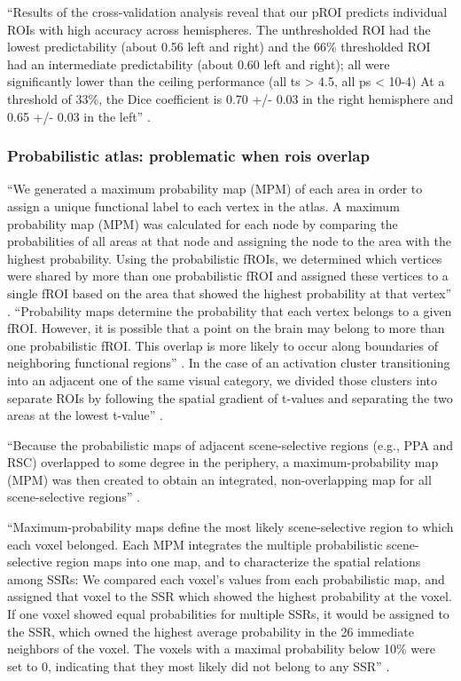 ``Results of the cross-validation analysis reveal that our pROI predicts
individual ROIs with high accuracy across hemispheres.
%
The unthresholded ROI had the lowest predictability (about 0.56 left and right)
and the 66\% thresholded ROI had an intermediate predictability (about 0.60 left
and right); all were significantly lower than the ceiling performance (all ts >
4.5, all ps < 10-4)
%
At a threshold of 33\%, the Dice coefficient is 0.70 +/- 0.03 in the right
hemisphere and 0.65 +/- 0.03 in the left'' \citep{weiner2018defining}.



\subsubsection{Probabilistic atlas: problematic when \acp{roi} overlap}

%
``We generated a maximum probability map (MPM) of each area in order to assign a
unique functional label to each vertex in the atlas.
%
A maximum probability map (MPM) was calculated for each node by comparing the
probabilities of all areas at that node and assigning the node to the area with
the highest probability.
%
Using the probabilistic fROIs, we determined which vertices were shared by more
than one probabilistic fROI and assigned these vertices to a single fROI based
on the area that showed the highest probability at that vertex''
\citep{rosenke2021probabilistic}.
%
``Probability maps determine the probability that each vertex belongs to a
given fROI.
%
However, it is possible that a point on the brain may belong to more than one
probabilistic fROI.
%
This overlap is more likely to occur along boundaries of neighboring functional
regions'' \citep{rosenke2021probabilistic}.
%
In the case of an activation cluster transitioning into an adjacent one of the
same visual category, we divided those clusters into separate ROIs by following
the spatial gradient of t-values and separating the two areas at the lowest
t-value'' \citep{rosenke2021probabilistic}.


%
``Because the probabilistic maps of adjacent scene-selective regions (e.g., PPA
and RSC) overlapped to some degree in the periphery, a maximum-probability map
(MPM) was then created to obtain an integrated, non-overlapping map for all
scene-selective regions'' \citep{zhen2017quantifying}.

%
``Maximum-probability maps define the most likely scene-selective region to
which each voxel belonged.
%
Each MPM integrates the multiple probabilistic scene-selective region maps into
one map, and to characterize the spatial relations among SSRs:
%
We compared each voxel's values from each probabilistic map, and assigned that
voxel to the SSR which showed the highest probability at the voxel.
%
If one voxel showed equal probabilities for multiple SSRs, it would be assigned
to the SSR, which owned the highest average probability in the 26 immediate
neighbors of the voxel.
%
The voxels with a maximal probability below 10\% were set to 0, indicating that
they most likely did not belong to any SSR'' \citep{zhen2017quantifying}.

